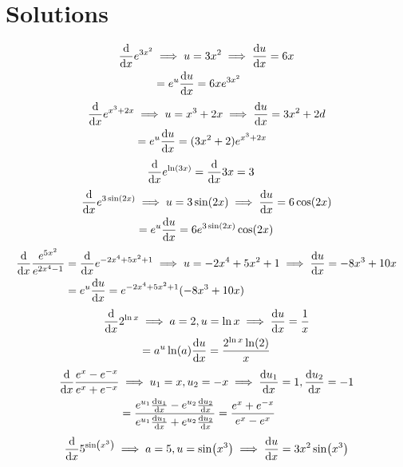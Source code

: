 \documentclass{article}
\begin{document}
	\section*{Solutions}
		\begin{tasks}[style = enumerate]
			\task
				\begin{align*}
					\dv{x} e^{3x^2} &\implies u = 3x^2
							\implies \dv{u}{x} = 6x \\
						&= e^u\dv{u}{x}
							= 6xe^{3x^2}
				\end{align*}
			\task
				\begin{align*}
					\dv{x} e^{x^3 + 2x}	&\implies u=x^3 + 2x
							\implies\dv{u}{x}=3x^2 + 2d \\
						&= e^u\dv{u}{x} = (3x^2 + 2)e^{x^3 + 2x}
				\end{align*}
			\task
				\begin{align*}
					\dv{x} e^{\ln(3x)} &= \dv{x} 3x
							= 3	
				\end{align*}
			\task
				\begin{align*}
					\dv{x} e^{3\sin(2x)} &\implies u = 3\sin(2x)
							\implies \dv{u}{x} = 6\cos(2x) \\
						&= e^u\dv{u}{x} = 6e^{3\sin(2x)}\cos(2x)
				\end{align*}
			\task
				\begin{align*}
					\dv{x} \frac{e^{5x^2}}{e^{2x^4 - 1}} &= \dv{x} e^{-2x^4 + 5x^2 + 1}
							\implies u = -2x^4 + 5x^2 + 1
							\implies \dv{u}{x} = -8x^3 + 10x \\
						&= e^u\dv{u}{x}
							= e^{-2x^4 + 5x^2 + 1}(-8x^3 + 10x)
				\end{align*}
			\task
				\begin{align*}
					\dv{x} 2^{\ln x} &\implies a = 2, u = \ln x
							\implies \dv{u}{x} = \frac{1}{x} \\
						&= a^u\ln(a)\dv{u}{x}
							= \frac{2^{\ln x}\ln(2)}{x}
				\end{align*}
			\task
				\begin{align*}
					\dv{x} \frac{e^x - e^{-x}}{e^x + e^{-x}} &\implies u_1 = x, u_2 = -x
							\implies \dv{u_1}{x} = 1, \dv{u_2}{x} = -1 \\
						&= \frac{e^{u_1}\dv{u_1}{x} - e^{u_2}\dv{u_2}{x}}{e^{u_1}\dv{u_1}{x} + e^{u_2}\dv{u_2}{x}}	
							= \frac{e^x + e^{-x}}{e^x - e^x}
				\end{align*}
			\task
				\begin{align*}
					\dv{x} 5^{\sin(x^3)} &\implies a = 5, u = \sin(x^3)
							\implies \dv{u}{x} = 3x^2\sin(x^3) \\

\end{align*}
\end{tasks}
\end{document}
